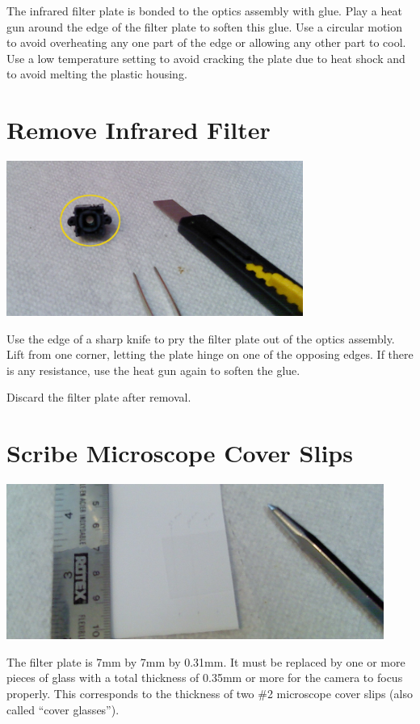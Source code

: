 The infrared filter plate is bonded to the optics assembly with glue. Play a
heat gun around the edge of the filter plate to soften this glue. Use a
circular motion to avoid overheating any one part of the edge or allowing any
other part to cool. Use a low temperature setting to avoid cracking the plate
due to heat shock and to avoid melting the plastic housing.

\section{Remove Infrared Filter}

\includegraphics[height=2in]{pics-c920/11-knife.jpg}

Use the edge of a sharp knife to pry the filter plate out of the optics
assembly. Lift from one corner, letting the plate hinge on one of the
opposing edges. If there is any resistance, use the heat gun again to soften
the glue.

Discard the filter plate after removal.

\section{Scribe Microscope Cover Slips}

\includegraphics[height=2in]{pics-c920/13-scribingslides.jpg}

The filter plate is 7mm by 7mm by 0.31mm. It must be replaced by one or more
pieces of glass with a total thickness of 0.35mm or more for the camera to
focus properly. This corresponds to the thickness of two \#2 microscope cover
slips (also called ``cover glasses'').

